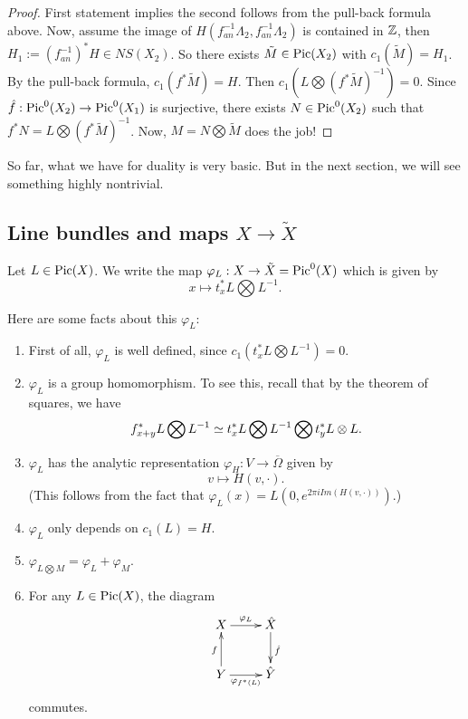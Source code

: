 \begin{proof}
First statement implies the second follows from the pull-back formula above. 
Now, assume the image of $H(f_{an}^{-1}\Lambda_2, f_{an}^{-1} \Lambda_2)$ is contained in ${\mathbb Z}$, then $H_1:=(f_{an}^{-1})^* H\in NS(X_2)$. So there exists $\tilde{M}\in \operatorname{Pic}(X_2)$ with $c_1(\tilde{M})=H_1$. By the pull-back formula, $c_1(f^* \tilde{M})=H$. Then $c_1(L\bigotimes (f^* \tilde{M})^{-1})=0$. Since $\hat{f}:\operatorname{Pic}^0(X_2)\to \operatorname{Pic}^0(X_1)$ is surjective, there exists $N\in \operatorname{Pic}^0(X_2)$ such that $f^* N = L\bigotimes (f^* \tilde{M})^{-1}$. Now, $M=N\bigotimes \tilde{M}$ does the job!
\end{proof}

So far, what we have for duality is very basic. But in the next section, we will see something highly nontrivial. 

\subsection{Line bundles and maps $X\to \tilde{X}$}
Let $L\in \operatorname{Pic}(X)$. We write the map $\varphi_L:X\to \tilde{X}=\operatorname{Pic}^0(X)$ which is given by 
$$x\mapsto t_x^* L\bigotimes L^{-1}.$$ 

Here are some facts about this $\varphi_L$:

\begin{enumerate}

\item
First of all, $\varphi_L$ is well defined, since $c_1(t_x^* L\bigotimes L^{-1})=0$.


\item $\varphi_L$ is a group homomorphism. To see this, recall that
by the theorem of squares, we have
$$f_{x+y}^* L\bigotimes L^{-1}\simeq t_x^*L \bigotimes L^{-1} \bigotimes t_y^*L\otimes L.$$


\item $\varphi_L$ has the analytic representation $\varphi_H:V\to \overline{\Omega}$ given by 
$$v\mapsto H(v,\cdot ).$$
(This follows from the fact that $\varphi_L(x)=L(0,e^{2\pi i Im(H(v,\cdot))})$.)

\item $\varphi_L$ only depends on $c_1(L)=H$.
\item $\varphi_{L\bigotimes M}=\varphi_L + \varphi_M$.

\item For any $L\in \operatorname{Pic}(X)$, the diagram 
\[
\xymatrix{
X \ar[r]^{\varphi_L} &\hat{X} \ar[d]^{\hat{f}}\\
Y \ar[u]^{f} \ar[r]_{\varphi_{f^*(L)}} & \hat{Y}\\
}
\]
commutes. 

\end{enumerate}

